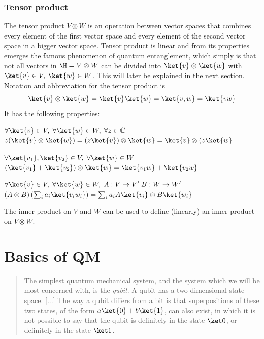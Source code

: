 	\subsubsection*{Tensor product}
	The tensor product $V\otimes W$ is an operation between vector spaces that combines every element of the first vector space and every element of the second vector space in a bigger vector space. Tensor product is linear and from its properties emerges the famous phenomenon of quantum entanglement, which simply is that not all vectors in $\H = V\otimes W$ can be divided into $\ket{v}\otimes\ket{w}$ with $\ket{v}\in V,\; \ket{w}\in W$. This will later be explained in the next section.\\
	Notation and abbreviation for the tensor product is 
	$$ \ket{v}\otimes\ket{w} = \ket{v}\ket{w} = \ket{v,w} = \ket{vw}$$
	It has the following properties:
	\begin{description}
		\item $\forall\ket{v}\in V ,\; \forall\ket{w}\in W, \; \forall z\in \mathbb{C}$	\\
					$ z(\ket{v}\otimes\ket{w}) = (z\ket{v})\otimes\ket{w} = \ket{v}\otimes(z\ket{w} $
		\item $\forall\ket{v_1},\ket{v_2}\in V ,\; \forall\ket{w}\in W$	\\
					$ (\ket{v_1} + \ket{v_2})\otimes\ket{w} = \ket{v_1w} + \ket{v_2w} $
		\item $\forall\ket{v}\in V ,\; \forall\ket{w}\in W, \; A:V\rightarrow V' \; B:W\rightarrow W'$	\\
					$ (A\otimes B) \left(\sum_i a_i \ket{v_i w_i} \right) = \sum_i a_i A\ket{v_i}\otimes B\ket{w_i} $
	\end{description}
	The inner product on $V$ and $W$ can be used to define (linearly) an inner product on $V\otimes W$.	
	
	
	\section{Basics of QM}
	\begin{quotation}
		The simplest quantum mechanical system, and the system which we will be most concerned with, is the \emph{qubit}. A qubit has a two-dimensional state space. [...] 
		The way a qubit differs from a bit is that superpositions of these two states, of the form $a\ket{0} + b\ket{1}$, can also exist, in which it is not possible to say that the qubit is definitely in the state $\ket0$, or definitely in the state $\ket1$.
		\cite{NC10}
	\end{quotation}
	

